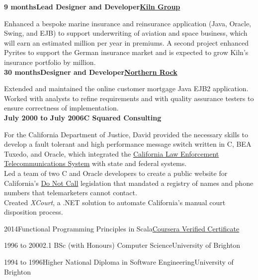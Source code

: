 \documentclass[a4paper,12pt]{article}
\newcommand{\head}[1]{\begin{center}{\large{\textbf{\sc{#1}}}}\nopagebreak\end{center}}
\newcommand{\jobheld}[2]{\textbf{#1\hfill #2}\nopagebreak}
\newcommand{\clientwork}[3]{\textbf{#1\hfill#3\hfill#2}\nopagebreak}
\newcommand{\tab}{\hspace{2em}}
\newcommand{\education}[3]{#1\tab#2\hfill#3}
\begin{document}
\clientwork{9 months}{\href{http://kilngroup.com/}{Kiln Group}}{Lead Designer and Developer}

Enhanced a bespoke marine insurance and reinsurance application (Java, Oracle, Swing, and EJB) to support underwriting of aviation and space business, which will earn an estimated  million per year in premiums. A second project enhanced Pyrites to support the German insurance market and is expected to grow  Kiln's insurance portfolio by  million.\\

\clientwork{30 months}{\href{http://www.northernrock.co.uk}{Northern Rock}}{Designer and Developer}

Extended and maintained the online customer mortgage Java EJB2 application. Worked with analysts to refine requirements and with quality assurance testers to ensure correctness of implementation.\\

\jobheld{July 2000 to July 2006}{C Squared Consulting}

For the California Department of Justice, David provided the necessary skills to develop a fault tolerant and high performance message switch written in C, BEA Tuxedo, and Oracle, which integrated the \href{http://definitions.uslegal.com/c/clets/}{California Law Enforcement Telecommunications System} with state and federal systems.\\

Led a team of two C and Oracle developers to create a public website for California's \href{http://www.sfgate.com/cgi-bin/article.cgi?f=/c/a/2003/03/31/MN5478.DTL}{Do Not Call} legislation that mandated a registry of names and phone numbers that telemarketers cannot contact.\\

Created \emph{XCourt}, a .NET solution to automate California's manual court disposition process.\\

\head{Certifications}

\education{2014}{Functional Programming Principles in Scala}{\href{https://www.coursera.org/maestro/api/certificate/get_certificate?verify-code=87DZAXY7SA}{Coursera Verified Certificate}}

\head{Education}

\education{1996 to 2000}{2.1 BSc (with Honours) Computer Science}{University of Brighton}

\education{1994 to 1996}{Higher National Diploma in Software Engineering}{University of Brighton}
\end{document}
